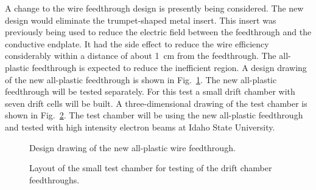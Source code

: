 A change to the wire feedthrough design is presently being considered. The 
new design would eliminate the trumpet-shaped metal insert. This insert was
previously being used to reduce the electric field between the feedthrough 
and the conductive endplate. It had the side effect to reduce the wire 
efficiency considerably within a distance of about 1~cm from the feedthrough. 
The all-plastic feedthrough is expected to reduce the inefficient region.  A 
design drawing of the new all-plastic feedthrough is shown in 
Fig.~\ref{proto:newfeed}.  The new all-plastic feedthrough will be tested 
separately.  For this test a small drift chamber with seven drift cells will 
be built.  A three-dimensional drawing of the test chamber is shown in 
Fig.~\ref{proto:babydc}.  The test chamber will be using the new all-plastic 
feedthrough and tested with high intensity electron beams at Idaho State 
University.

\begin{figure}[htpb]
\vspace{4.5cm} 
\caption{\small{Design drawing of the new all-plastic wire feedthrough.}}
\label{proto:newfeed}
\end{figure}

\begin{figure}[htpb]
\vspace{6.5cm} 
\caption{\small{Layout of the small test chamber for testing of the 
drift chamber feedthroughs.
\label{proto:babydc}}}
\end{figure}

